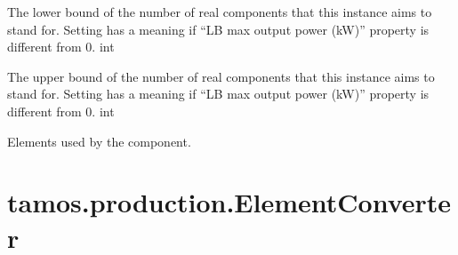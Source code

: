 \documentclass[letterpaper,10pt,english]{sphinxmanual}
\begin{document}
\begin{fulllineitems}
\begin{fulllineitems}
\label{\detokenize{generated/tamos.production.ElectricHeater:tamos.production.ElectricHeater.units_number_lb}}
\pysigstartsignatures
{}
\pysigstopsignatures
\sphinxAtStartPar
The lower bound of the number of real components that this instance aims to stand for.
Setting  has a meaning if “LB max output power (kW)” property is different from 0.
int

\end{fulllineitems}


\begin{fulllineitems}
\label{\detokenize{generated/tamos.production.ElectricHeater:tamos.production.ElectricHeater.units_number_ub}}
\pysigstartsignatures
{}
\pysigstopsignatures
\sphinxAtStartPar
The upper bound of the number of real components that this instance aims to stand for.
Setting  has a meaning if “LB max output power (kW)” property is different from 0.
int

\end{fulllineitems}


\begin{fulllineitems}
\label{\detokenize{generated/tamos.production.ElectricHeater:tamos.production.ElectricHeater.used_elements}}
\pysigstartsignatures
{}
\pysigstopsignatures
\sphinxAtStartPar
Elements used by the component.

\end{fulllineitems}


\end{fulllineitems}


\sphinxstepscope


\section{tamos.production.ElementConverter}
\label{\detokenize{generated/tamos.production.ElementConverter:tamos-production-elementconverter}}\label{\detokenize{generated/tamos.production.ElementConverter::doc}}
\end{document}
